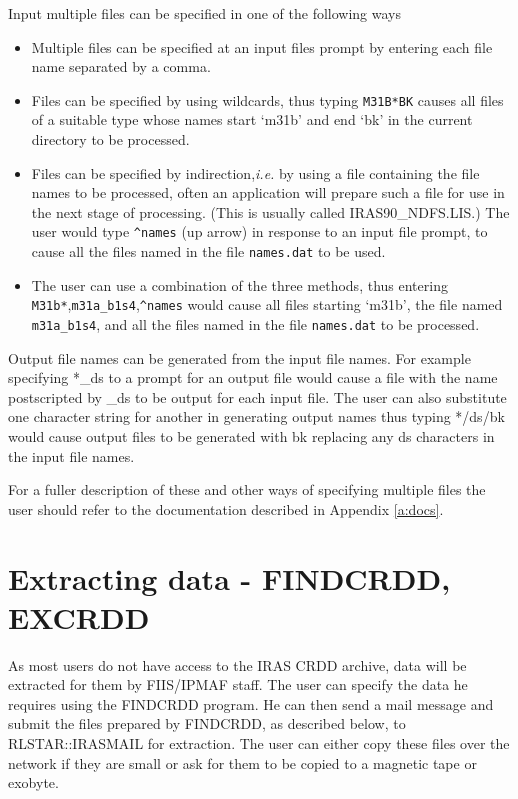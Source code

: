 \documentclass[twoside,11pt]{starlink}
\begin{document}
Input multiple files can be specified in one of the following ways
\begin{itemize}
\item Multiple files can be specified at an input files prompt by entering each
file name separated by a comma.
\item Files can be specified by using wildcards, thus typing \texttt{M31B*BK}
causes all files of a suitable type whose names start `m31b' and end `bk' in the
current directory to be processed.
\item Files can be specified by indirection,\emph{i.e.} by using a file
containing the file names to be processed, often an application will prepare
such a file  for use in the next stage of processing. (This is usually called
IRAS90\_NDFS.LIS.) The user would type \verb+^names+ (up arrow) in
response to an input file prompt, to cause all the files named in the
file \texttt{names.dat} to be used.

\item The user can use a combination of the three methods, thus entering
\texttt{M31b*},\texttt{m31a\_b1s4},\verb+^names+ would cause all files starting
`m31b', the file named \texttt{m31a\_b1s4}, and all the files named in the file
\texttt{names.dat} to be processed.

\end{itemize}

Output file names can be generated from the input file names. For example
specifying *\_ds to a prompt for an output file would cause a file with the
name postscripted by \_ds to be output for each input file. The user can also
substitute one character string for another in generating output names thus
typing */ds/bk would cause output files to be generated with bk replacing any
ds characters in the input file names.

For a fuller description of these and other ways of specifying multiple files
the user should refer to the documentation described in Appendix \ref{a:docs}.

\section{Extracting data - FINDCRDD, EXCRDD
\label{m:extract}}

As most users do not have access to the IRAS CRDD archive, data will be
extracted for them by FIIS/IPMAF staff. The user can specify the data he
requires
using the FINDCRDD program. He can then send a mail message and submit the
files prepared by FINDCRDD, as described below, to RLSTAR::IRASMAIL for
extraction. The user can either copy these files over the network if they are
small or ask for them to be copied to a magnetic tape or exobyte.
\end{document}
